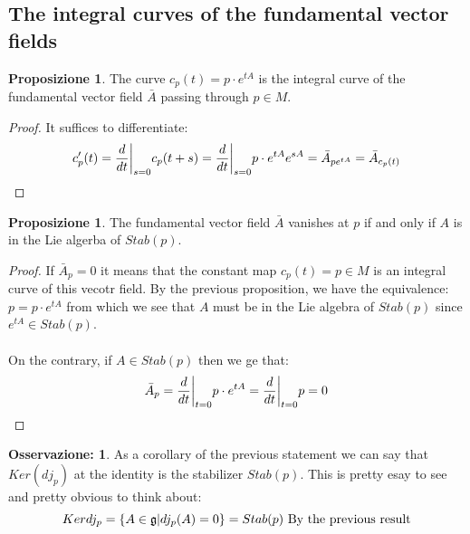\documentclass[12pt,a4paper]{report}
\theoremstyle{definition}
\theoremstyle{Theorem}
\newtheorem{Prop}[Def]{Proposizione}
\theoremstyle{definition}
\theoremstyle{definition}
\theoremstyle{definition}
\newtheorem{Obs}[Def]{Osservazione:}
\begin{document}
		\subsection{The integral curves of the fundamental vector fields}
		\begin{Prop}
			The curve $c_p(t)=p\cdot e^{tA}$ is the integral curve of the fundamental vector field $\bar{A}$ passing through $p\in M$.
		\end{Prop}
		\begin{proof}
			It suffices to differentiate:
			$$c'_p(t)={d\over dt}\bigg|_{s=0}c_p(t+s)=
			{d\over dt}\bigg|_{s=0}p\cdot e^{tA}e^{sA}=\bar{A}_{pe^{tA}}=
			\bar{A}_{c_p(t)}$$
		\end{proof}
		\begin{Prop}
			The fundamental vector field $\bar{A}$ vanishes at $p$ if and only if $A$ is in the Lie algerba of $Stab(p)$.
		\end{Prop}
		\begin{proof}
			If $\bar{A}_p=0$ it means that the constant map $c_p(t)=p\in M$ is an integral curve of this vecotr field. By the previous proposition, we have the equivalence:
			$p=p\cdot e^{tA}$ from which we see that $A$ must be in the Lie algebra of $Stab(p)$ since $e^{tA}\in Stab(p)$.\\
			\\
			On the contrary, if $A\in Stab(p)$ then we ge that:
			$$\bar{A}_p={d\over dt}\bigg|_{t=0}p\cdot e^{tA}=
			{d\over dt}\bigg|_{t=0}p=0$$
		\end{proof}
		\begin{Obs}
			As a corollary of the previous statement we can say that $Ker(dj_p)$ at the identity is the stabilizer $Stab(p)$. This is pretty esay to see and pretty obvious to think about:
			$$Ker dj_p=\{A\in \mathfrak{g}|dj_p(A)=0\}=Stab(p)\hbox{ By the previous result}$$
		\end{Obs}
\end{document}

